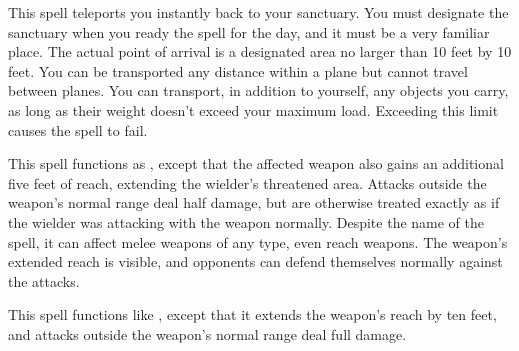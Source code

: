 \spelleffect This spell teleports you instantly back to your sanctuary. You must designate the sanctuary when you ready the spell for the day, and it must be a very familiar place. The actual point of arrival is a designated area no larger than 10 feet by 10 feet. You can be transported any distance within a plane but cannot travel between planes. You can transport, in addition to yourself, any objects you carry, as long as their weight doesn't exceed your maximum load. Exceeding this limit causes the spell to fail.

\spelldur{\durshort}
\spelleffect This spell functions as , except that the affected weapon also gains an additional five feet of reach, extending the wielder's threatened area. Attacks outside the weapon's normal range deal half damage, but are otherwise treated exactly as if the wielder was attacking with the weapon normally.
\spellnotes Despite the name of the spell, it can affect melee weapons of any type, even reach weapons. The weapon's extended reach is visible, and opponents can defend themselves normally against the attacks.

\spelleffect This spell functions like , except that it extends the weapon's reach by ten feet, and attacks outside the weapon's normal range deal full damage.

